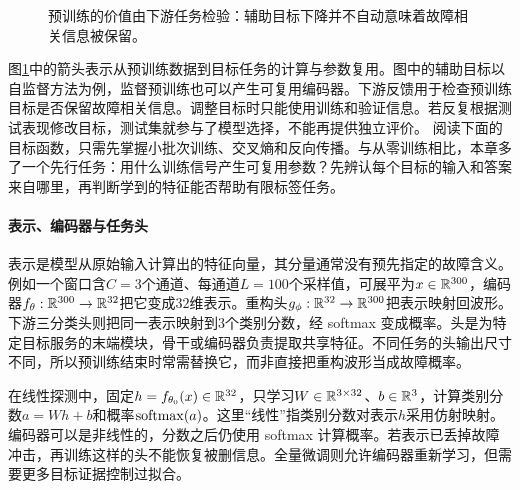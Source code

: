 \begin{figure}[htbp]
\centering
{}
\caption{预训练的价值由下游任务检验：辅助目标下降并不自动意味着故障相关信息被保留。}
\label{fig:pretraining-downstream-validation}
\end{figure}
图\ref{fig:pretraining-downstream-validation}中的箭头表示从预训练数据到目标任务的计算与参数复用。图中的辅助目标以自监督方法为例，监督预训练也可以产生可复用编码器。下游反馈用于检查预训练目标是否保留故障相关信息。调整目标时只能使用训练和验证信息。若反复根据测试表现修改目标，测试集就参与了模型选择，不能再提供独立评价。
阅读下面的目标函数，只需先掌握小批次训练、交叉熵和反向传播。与从零训练相比，本章多了一个先行任务：用什么训练信号产生可复用参数？先辨认每个目标的输入和答案来自哪里，再判断学到的特征能否帮助有限标签任务。

\paragraph{表示、编码器与任务头}
表示是模型从原始输入计算出的特征向量，其分量通常没有预先指定的故障含义。例如一个窗口含$C=3$个通道、每通道$L=100$个采样值，可展平为$x\in\mathbb{R}^{300}$，编码器$f_\theta:\mathbb{R}^{300}\to\mathbb{R}^{32}$把它变成$32$维表示。重构头$g_\phi:\mathbb{R}^{32}\to\mathbb{R}^{300}$把表示映射回波形。下游三分类头则把同一表示映射到$3$个类别分数，经 softmax 变成概率。头是为特定目标服务的末端模块，骨干或编码器负责提取共享特征。不同任务的头输出尺寸不同，所以预训练结束时常需替换它，而非直接把重构波形当成故障概率。

在线性探测中，固定$h=f_{\theta_0}(x)\in\mathbb{R}^{32}$，只学习$W\in\mathbb{R}^{3\times32}$、$b\in\mathbb{R}^3$，计算类别分数$a=Wh+b$和概率$\operatorname{softmax}(a)$。这里“线性”指类别分数对表示$h$采用仿射映射。编码器可以是非线性的，分数之后仍使用 softmax 计算概率。若表示已丢掉故障冲击，再训练这样的头不能恢复被删信息。全量微调则允许编码器重新学习，但需要更多目标证据控制过拟合。

